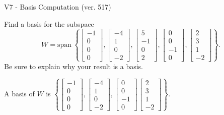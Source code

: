 \begin{exercise}
  \begin{exerciseTitle}V7 - Basis Computation (ver. 517)\end{exerciseTitle}
  \begin{exerciseStatement}
    Find a basis for the subspace 
\[W=\mathrm{span}\ \left\{\left[\begin{array}{r}
-1 \\
0 \\
0 \\
0
\end{array}\right] , \left[\begin{array}{r}
-4 \\
1 \\
0 \\
-2
\end{array}\right] , \left[\begin{array}{r}
5 \\
-1 \\
0 \\
2
\end{array}\right] , \left[\begin{array}{r}
0 \\
0 \\
-1 \\
0
\end{array}\right] , \left[\begin{array}{r}
2 \\
3 \\
1 \\
-2
\end{array}\right]\right\}.\]
 Be sure to explain why your result is a basis.


  \end{exerciseStatement}
  \begin{exerciseAnswer}
   A basis of \(W\) is  \(\left\{\left[\begin{array}{r}
-1 \\
0 \\
0 \\
0
\end{array}\right] , \left[\begin{array}{r}
-4 \\
1 \\
0 \\
-2
\end{array}\right] , \left[\begin{array}{r}
0 \\
0 \\
-1 \\
0
\end{array}\right] \left[\begin{array}{r}
2 \\
3 \\
1 \\
-2
\end{array}\right]\right\}\).
  


  \end{exerciseAnswer}
\end{exercise}